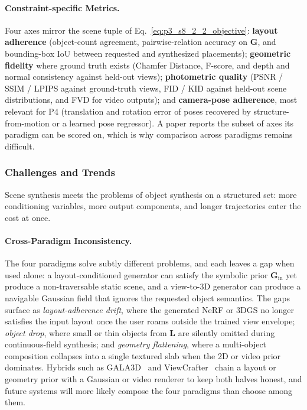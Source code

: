 \paragraph{Constraint-specific Metrics.}
Four axes mirror the scene tuple of Eq.~\eqref{eq:p3_s8_2_2_objective}: \textbf{layout adherence} (object-count agreement, pairwise-relation accuracy on $\mathbf{G}$, and bounding-box IoU between requested and synthesized placements); \textbf{geometric fidelity} where ground truth exists (Chamfer Distance, F-score, and depth and normal consistency against held-out views); \textbf{photometric quality} (PSNR / SSIM / LPIPS against ground-truth views, FID / KID against held-out scene distributions, and FVD for video outputs); and \textbf{camera-pose adherence}, most relevant for P4 (translation and rotation error of poses recovered by structure-from-motion or a learned pose regressor).
A paper reports the subset of axes its paradigm can be scored on, which is why comparison across paradigms remains difficult.


\subsubsection{Challenges and Trends}
\label{subsubsec:p3_s8_2_2_challenges}

Scene synthesis meets the problems of object synthesis on a structured set: more conditioning variables, more output components, and longer trajectories enter the cost at once.

\paragraph{Cross-Paradigm Inconsistency.}
The four paradigms solve subtly different problems, and each leaves a gap when used alone: a layout-conditioned generator can satisfy the symbolic prior $\mathbf{G}_{\text{in}}$ yet produce a non-traversable static scene, and a view-to-3D generator can produce a navigable Gaussian field that ignores the requested object semantics.
The gaps surface as \emph{layout-adherence drift}, where the generated NeRF or 3DGS no longer satisfies the input layout once the user roams outside the trained view envelope; \emph{object drop}, where small or thin objects from $\mathbf{L}$ are silently omitted during continuous-field synthesis; and \emph{geometry flattening}, where a multi-object composition collapses into a single textured slab when the 2D or video prior dominates.
Hybrids such as GALA3D~\cite{zhou2024gala3d} and ViewCrafter~\cite{yu2024viewcrafter} chain a layout or geometry prior with a Gaussian or video renderer to keep both halves honest, and future systems will more likely compose the four paradigms than choose among them.


